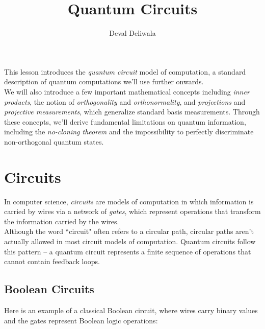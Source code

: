 \documentclass[svgnames]{article}     %
\title{Quantum Circuits}
\author{Deval Deliwala}
\begin{document}
\maketitle
\tableofcontents                     %
\newpage
This lesson introduces the \textit{quantum circuit} model of computation,
a standard description of quantum computations we'll use further onwards. \\

We will also introduce a few important mathematical concepts including
\textit{inner products}, the notion of \textit{orthogonality} and
\textit{orthonormality}, and \textit{projections} and \textit{projective
measurements}, which generalize standard basis measurements. Through these
concepts, we'll derive fundamental limitations on quantum information,
including the \textit{no-cloning theorem} and the impossibility to perfectly
discriminate non-orthogonal quantum states. \\

\section{Circuits}

In computer science, \textit{circuits} are models of computation in which
information is carried by wires via a network of \textit{gates}, which
represent operations that transform the information carried by the wires. \\

Although the word ``circuit" often refers to a circular path, circular paths
aren't actually allowed in most circuit models of computation. Quantum circuits
follow this pattern -- a quantum circuit represents a finite sequence of
operations that cannot contain feedback loops. 

\subsection{Boolean Circuits}

Here is an example of a classical Boolean circuit, where wires carry binary
values and the gates represent Boolean logic operations: 
\end{document}
